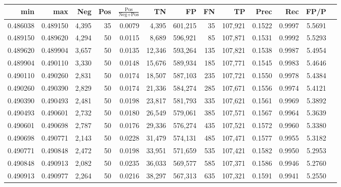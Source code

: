 \begin{tabular}{rrrrrrrrrrrrr}
\toprule
     min &      max &   Neg & Pos & $\frac{\text{Pos}}{\text{Neg}+\text{Pos}}$ &      TN &      FP &      FN &      TP &   Prec &    Rec &   FP/P \\
\midrule
0.486038 & 0.489150 & 4,395 &  35 &                                     0.0079 &   4,395 & 601,215 &      35 & 107,921 & 0.1522 & 0.9997 & 5.5691 \\
0.489150 & 0.489620 & 4,294 &  50 &                                     0.0115 &   8,689 & 596,921 &      85 & 107,871 & 0.1531 & 0.9992 & 5.5293 \\
0.489620 & 0.489904 & 3,657 &  50 &                                     0.0135 &  12,346 & 593,264 &     135 & 107,821 & 0.1538 & 0.9987 & 5.4954 \\
0.489904 & 0.490110 & 3,330 &  50 &                                     0.0148 &  15,676 & 589,934 &     185 & 107,771 & 0.1545 & 0.9983 & 5.4646 \\
0.490110 & 0.490260 & 2,831 &  50 &                                     0.0174 &  18,507 & 587,103 &     235 & 107,721 & 0.1550 & 0.9978 & 5.4384 \\
0.490260 & 0.490390 & 2,829 &  50 &                                     0.0174 &  21,336 & 584,274 &     285 & 107,671 & 0.1556 & 0.9974 & 5.4121 \\
0.490390 & 0.490493 & 2,481 &  50 &                                     0.0198 &  23,817 & 581,793 &     335 & 107,621 & 0.1561 & 0.9969 & 5.3892 \\
0.490493 & 0.490601 & 2,732 &  50 &                                     0.0180 &  26,549 & 579,061 &     385 & 107,571 & 0.1567 & 0.9964 & 5.3639 \\
0.490601 & 0.490698 & 2,787 &  50 &                                     0.0176 &  29,336 & 576,274 &     435 & 107,521 & 0.1572 & 0.9960 & 5.3380 \\
0.490698 & 0.490771 & 2,143 &  50 &                                     0.0228 &  31,479 & 574,131 &     485 & 107,471 & 0.1577 & 0.9955 & 5.3182 \\
0.490771 & 0.490848 & 2,472 &  50 &                                     0.0198 &  33,951 & 571,659 &     535 & 107,421 & 0.1582 & 0.9950 & 5.2953 \\
0.490848 & 0.490913 & 2,082 &  50 &                                     0.0235 &  36,033 & 569,577 &     585 & 107,371 & 0.1586 & 0.9946 & 5.2760 \\
0.490913 & 0.490977 & 2,264 &  50 &                                     0.0216 &  38,297 & 567,313 &     635 & 107,321 & 0.1591 & 0.9941 & 5.2550 \\

\end{tabular}
